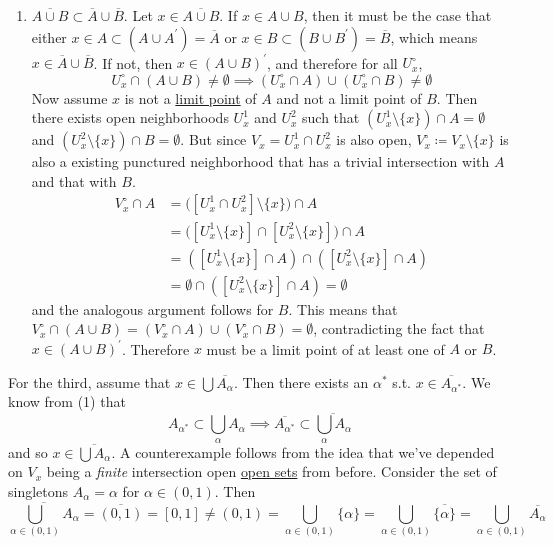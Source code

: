 \begin{solution}
\begin{enumerate}
      \item $\overline{A \cup B} \subset \overline{A} \cup \overline{B}$. Let $x \in \overline{A \cup B}$. If $x \in A \cup B$, then it must be the case that either $x \in A \subset (A \cup A^\prime) = \overline{A}$ or $x \in B \subset (B \cup B^\prime) = \overline{B}$, which means $x \in \overline{A} \cup \overline{B}$. If not, then $x \in (A \cup B)^\prime$, and therefore for all $U_x^\circ$, 
      \begin{equation}
        U_x^\circ \cap (A \cup B) \neq \emptyset \implies (U_x^\circ \cap A) \cup (U_x^\circ \cap B) \neq \emptyset
      \end{equation}
      Now assume $x$ is not a \hyperref[def:limit-point]{limit point} of $A$ and not a limit point of $B$. Then there exists open neighborhoods $U^1_x$ and $U^2_x$ such that $(U_x^1 \setminus \{x\}) \cap A = \emptyset$ and $(U_x^2 \setminus \{x\}) \cap B = \emptyset$. But since $V_x = U_x^1 \cap U_x^2$ is also open, $V_x^\circ \coloneqq V_x \setminus \{x\}$ is also a existing punctured neighborhood that has a trivial intersection with $A$ and that with $B$. 
      \begin{align}
        V_x^\circ \cap A & = \big( [U_x^1 \cap U_x^2] \setminus \{x\} \big) \cap A \\
                         & = \big( [U_x^1 \setminus \{x\}] \cap [U_x^2 \setminus \{x\}] \big) \cap A \\
                         & = ([U_x^1 \setminus \{x\}] \cap A) \cap ([U_x^2 \setminus \{x\}] \cap A) \\ 
                         & = \emptyset \cap ([U_x^2 \setminus \{x\}] \cap A) = \emptyset
      \end{align}
      and the analogous argument follows for $B$. This means that $V_x^\circ \cap (A \cup B) = (V_x^\circ \cap A) \cup (V_x^\circ \cap B) = \emptyset$, contradicting the fact that $x \in (A \cup B)^\prime$. Therefore $x$ must be a limit point of at least one of $A$ or $B$. 
    \end{enumerate}

    For the third, assume that $x \in \bigcup \overline{A_\alpha}$. Then there exists an $\alpha^\ast$ s.t. $x \in \overline{A_{\alpha^\ast}}$. We know from (1) that 
    \begin{equation}
      A_{\alpha^\ast} \subset \bigcup_{\alpha} A_\alpha \implies \overline{A_{\alpha^\ast}} \subset \overline{\bigcup_{\alpha} A_\alpha} 
    \end{equation}
    and so $x \in \overline{\bigcup A_\alpha}$. A counterexample follows from the idea that we've depended on $V_x$ being a \textit{finite} intersection open \hyperref[def:open-set]{open sets} from before. Consider the set of singletons $A_\alpha = \alpha$ for $\alpha \in (0, 1)$. Then
    \begin{equation}
      \overline{\bigcup_{\alpha \in (0, 1)} A_\alpha} = \overline{(0, 1)} = [0, 1] \neq (0, 1) = \bigcup_{\alpha \in (0, 1)} \{\alpha\} = \bigcup_{\alpha \in (0, 1)} \overline{\{\alpha\}} =  \bigcup_{\alpha \in (0, 1)} \overline{A_\alpha} 
    \end{equation}
  \end{solution}

